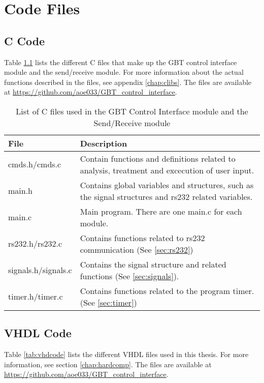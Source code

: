 \documentclass[main.tex]{subfiles}
\begin{document}
\chapter{Code Files}

\section{C Code}

Table \ref{tab:ccode} lists the different C files that make up the GBT control interface module and the send/receive module. For more information about the actual functions described in the files, see appendix \ref{chap:clibs}. The files are available at \url{https://github.com/aoe033/GBT_control_interface}.

\begin{table}[H]
\centering
\caption{List of C files used in the GBT Control Interface module and the Send/Receive module}
\label{tab:ccode}
\begin{tabular}{l p{8cm}}
\hline
 File & Description \\ \hline
 cmds.h/cmds.c & Contain functions and definitions related to analysis, treatment and excecution of user input.\\ %
 main.h & Contains global variables and structures, such as the signal structures and rs232 related variables. \\ %
 main.c & Main program. There are one main.c for each module.\\ %
 rs232.h/rs232.c & Contains functions related to rs232 communication (See \ref{sec:rs232})\\ %
 signals.h/signals.c & Contains the signal structure and related functions (See \ref{sec:signals}).\\ %
 timer.h/timer.c & Contains functions related to the program timer. (See \ref{sec:timer}) \\ \hline
\end{tabular}
\end{table}

\newpage

\section{VHDL Code}

Table \ref{tab:vhdcode} lists the different VHDL files used in this thesis. For more information, see section \ref{chap:hardcomp}. The files are available at \url{https://github.com/aoe033/GBT_control_interface}.
\end{document}
